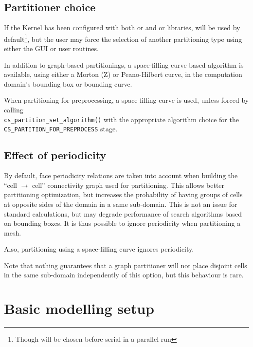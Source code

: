 {{\subsection{Partitioner choice\label{sec:parall:part:partlib}}

If the Kernel has been configured with both \ptscotch or \scotch and
\parmetis or \metis libraries, \ptscotch will be used by default\footnote{
Though \parmetis will be chosen before serial \scotch in a parallel
run}, but the user may force the selection of another partitioning
type using either the GUI or user routines.

In addition to graph-based partitionings, a space-filling curve based
algorithm is available, using either a Morton (Z) or Peano-Hilbert
curve, in the computation domain's bounding box or bounding curve.

When partitioning for preprocessing, a space-filling curve is used,
unless forced by calling\\ \texttt{cs\_partition\_set\_algorithm()}
with the appropriate algorithm choice for the\\
\texttt{CS\_PARTITION\_FOR\_PREPROCESS} stage.

\subsection{Effect of periodicity\label{sec:parall:part:noperiod}}

By default, face periodicity relations are taken into account when building
the ``cell $\rightarrow$ cell'' connectivity graph used for partitioning.
This allows better partitioning optimization, but increases the probability
of having groups of cells at opposite sides of the domain in a same
sub-domain. This is not an issue for standard calculations, but may
degrade performance of search algorithms based on bounding boxes.
It is thus possible to ignore periodicity when partitioning a mesh.

Also, partitioning using a space-filling curve ignores periodicity.

Note that nothing guarantees that a graph partitioner will not place
disjoint cells in the same sub-domain independently of this option,
but this behaviour is rare.

\section{Basic modelling setup}

}}
